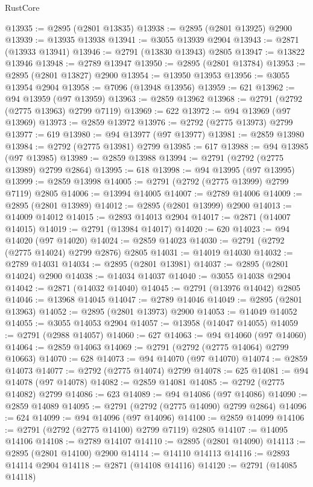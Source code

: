 \begin{lexlean}{RustCore}
\begin{coremodule}
@13935 := @2895 (@2801 @13835)
@13938 := @2895 (@2801 @13925) @2900
@13939 := @13935 @13938
@13941 := @3055 @13939 @2904
@13943 := @2871 (@13933 @13941)
@13946 := @2791 (@13830 @13943) @2805
@13947 := @13822 @13946
@13948 := @2789 @13947
@13950 := @2895 (@2801 @13784)
@13953 := @2895 (@2801 @13827) @2900
@13954 := @13950 @13953
@13956 := @3055 @13954 @2904
@13958 := @7096 (@13948 @13956)
@13959 := 621
@13962 := @94 @13959 (@97 @13959)
@13963 := @2859 @13962
@13968 := @2791 (@2792 (@2775 @13963) @2799 @7119)
@13969 := 622
@13972 := @94 @13969 (@97 @13969)
@13973 := @2859 @13972
@13976 := @2792 (@2775 @13973) @2799
@13977 := 619
@13980 := @94 @13977 (@97 @13977)
@13981 := @2859 @13980
@13984 := @2792 (@2775 @13981) @2799
@13985 := 617
@13988 := @94 @13985 (@97 @13985)
@13989 := @2859 @13988
@13994 := @2791 (@2792 (@2775 @13989) @2799 @2864)
@13995 := 618
@13998 := @94 @13995 (@97 @13995)
@13999 := @2859 @13998
@14005 := @2791 (@2792 (@2775 @13999) @2799 @7119) @2805
@14006 := @13994 @14005
@14007 := @2789 @14006
@14009 := @2895 (@2801 @13989)
@14012 := @2895 (@2801 @13999) @2900
@14013 := @14009 @14012
@14015 := @2893 @14013 @2904
@14017 := @2871 (@14007 @14015)
@14019 := @2791 (@13984 @14017)
@14020 := 620
@14023 := @94 @14020 (@97 @14020)
@14024 := @2859 @14023
@14030 := @2791 (@2792 (@2775 @14024) @2799 @2876) @2805
@14031 := @14019 @14030
@14032 := @2789 @14031
@14034 := @2895 (@2801 @13981)
@14037 := @2895 (@2801 @14024) @2900
@14038 := @14034 @14037
@14040 := @3055 @14038 @2904
@14042 := @2871 (@14032 @14040)
@14045 := @2791 (@13976 @14042) @2805
@14046 := @13968 @14045
@14047 := @2789 @14046
@14049 := @2895 (@2801 @13963)
@14052 := @2895 (@2801 @13973) @2900
@14053 := @14049 @14052
@14055 := @3055 @14053 @2904
@14057 := @13958 (@14047 @14055)
@14059 := @2791 (@2988 @14057)
@14060 := 627
@14063 := @94 @14060 (@97 @14060)
@14064 := @2859 @14063
@14069 := @2791 (@2792 (@2775 @14064) @2799 @10663)
@14070 := 628
@14073 := @94 @14070 (@97 @14070)
@14074 := @2859 @14073
@14077 := @2792 (@2775 @14074) @2799
@14078 := 625
@14081 := @94 @14078 (@97 @14078)
@14082 := @2859 @14081
@14085 := @2792 (@2775 @14082) @2799
@14086 := 623
@14089 := @94 @14086 (@97 @14086)
@14090 := @2859 @14089
@14095 := @2791 (@2792 (@2775 @14090) @2799 @2864)
@14096 := 624
@14099 := @94 @14096 (@97 @14096)
@14100 := @2859 @14099
@14106 := @2791 (@2792 (@2775 @14100) @2799 @7119) @2805
@14107 := @14095 @14106
@14108 := @2789 @14107
@14110 := @2895 (@2801 @14090)
@14113 := @2895 (@2801 @14100) @2900
@14114 := @14110 @14113
@14116 := @2893 @14114 @2904
@14118 := @2871 (@14108 @14116)
@14120 := @2791 (@14085 @14118)

\end{coremodule}
\end{lexlean}
